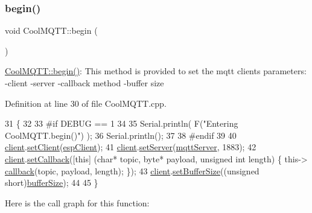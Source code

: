 \subsubsection{\texorpdfstring{begin()}{begin()}}
{\footnotesize\ttfamily void Cool\+M\+Q\+T\+T\+::begin (\begin{DoxyParamCaption}{ }\end{DoxyParamCaption})}

\hyperlink{class_cool_m_q_t_t_ac9248808641ebf3054ed0620ea9d0100}{Cool\+M\+Q\+T\+T\+::begin()}\+: This method is provided to set the mqtt client\textquotesingle{}s parameters\+: -\/client -\/server -\/callback method -\/buffer size 

Definition at line 30 of file Cool\+M\+Q\+T\+T.\+cpp.


\begin{DoxyCode}
31 \{ 
32 
33 \textcolor{preprocessor}{#if DEBUG == 1 }
34 
35     Serial.println( F(\textcolor{stringliteral}{"Entering CoolMQTT.begin()"}) );
36     Serial.println();
37 
38 \textcolor{preprocessor}{#endif}
39 
40     \hyperlink{class_cool_m_q_t_t_afed1372683c44893b4668d0f1771f514}{client}.\hyperlink{class_cool_pub_sub_client_a7ee119b786010561ab6a9afa0798e91d}{setClient}(\hyperlink{class_cool_m_q_t_t_acc30a0200967374a524092a8a806502a}{espClient});
41     \hyperlink{class_cool_m_q_t_t_afed1372683c44893b4668d0f1771f514}{client}.\hyperlink{class_cool_pub_sub_client_a947e70c394c66c7d08d0c53caf8425e3}{setServer}(\hyperlink{class_cool_m_q_t_t_ab8bb951f87ddbf92db74c2ad16a3e53e}{mqttServer}, 1883);    
42     \hyperlink{class_cool_m_q_t_t_afed1372683c44893b4668d0f1771f514}{client}.\hyperlink{class_cool_pub_sub_client_ac5cab7658f1bdded32131241e468e661}{setCallback}([\textcolor{keyword}{this}] (\textcolor{keywordtype}{char}* topic, byte* payload, \textcolor{keywordtype}{unsigned} \textcolor{keywordtype}{int} length) \{ this->
      \hyperlink{class_cool_m_q_t_t_a30d82ad665bfb603f46ecdbc290775df}{callback}(topic, payload, length); \});
43     \hyperlink{class_cool_m_q_t_t_afed1372683c44893b4668d0f1771f514}{client}.\hyperlink{class_cool_pub_sub_client_a4f83e54f1ba96e32f725d93cdec283b7}{setBufferSize}((\textcolor{keywordtype}{unsigned} \textcolor{keywordtype}{short})\hyperlink{class_cool_m_q_t_t_a7f3cf26b51d6770f216e42c5ef13ca9f}{bufferSize});
44 
45 \}
\end{DoxyCode}
Here is the call graph for this function\+:\nopagebreak
